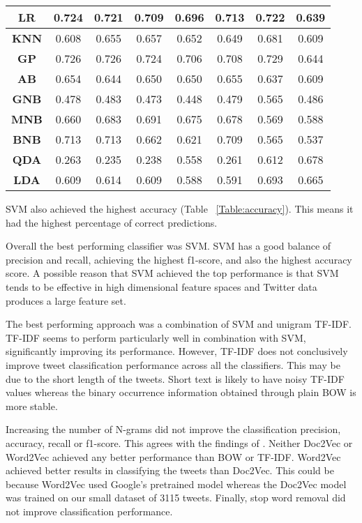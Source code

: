 \begin{table}[h!]
{\begin{tabular}{cccccccc}
\textbf{LR} & 0.724 & 0.721 & 0.709 & 0.696 & 0.713 & 0.722 & 0.639  \\ \hline
\rowcolor[HTML]{EFEFEF} 
\textbf{KNN} & 0.608 & 0.655 & 0.657 & 0.652 & 0.649 & 0.681 & 0.609  \\ \hline
\textbf{GP} & 0.726 & 0.726 & 0.724 & 0.706 & 0.708 & 0.729 & 0.644  \\ \hline
\rowcolor[HTML]{EFEFEF} 
\textbf{AB} & 0.654 & 0.644 & 0.650 & 0.650 & 0.655 & 0.637 & 0.609  \\ \hline
\textbf{GNB} & 0.478 & 0.483 & 0.473 & 0.448 & 0.479 & 0.565 & 0.486  \\ \hline
\rowcolor[HTML]{EFEFEF} 
\textbf{MNB} & \multicolumn{1}{c}{\cellcolor[HTML]{EFEFEF}0.660} & 0.683 & 0.691 & 0.675 & 0.678 & 0.569 & 0.588  \\ \hline
\rowcolor[HTML]{FFFFFF} 
\textbf{BNB} & 0.713 & 0.713 & 0.662 & 0.621 & 0.709 & 0.565 & 0.537  \\ \hline
\rowcolor[HTML]{EFEFEF} 
\textbf{QDA} & 0.263 & 0.235 & 0.238 & 0.558 & 0.261 & 0.612 & 0.678  \\ \hline
\rowcolor[HTML]{FFFFFF} 
\textbf{LDA} & 0.609 & 0.614 & 0.609 & 0.588 & 0.591 & 0.693 & 0.665  \\ \hline
\end{tabular}}
\end{table}

SVM also achieved the highest accuracy (Table ~\ref{Table:accuracy}). This means it had the highest percentage of correct predictions.

Overall the best performing classifier was SVM. SVM has a good balance of precision and recall, achieving the highest f1-score, and also the highest accuracy score. A possible reason that SVM achieved the top performance is that SVM tends to be effective in high dimensional feature spaces and Twitter data produces a large feature set.

The best performing approach was a combination of SVM and unigram TF-IDF. TF-IDF seems to perform particularly well in combination with SVM, significantly improving its performance. However, TF-IDF does not conclusively improve tweet classification performance across all the classifiers. This may be due to the short length of the tweets. Short text is likely to have noisy TF-IDF values whereas the binary occurrence information obtained through plain BOW is more stable.

Increasing the number of N-grams did not improve the classification precision, accuracy, recall or f1-score. This agrees with the findings of \cite{Berm2010}. Neither Doc2Vec or Word2Vec achieved any better performance than BOW or TF-IDF. Word2Vec achieved better results in classifying the tweets than Doc2Vec. This could be because Word2Vec used Google's pretrained model whereas the Doc2Vec model was trained on our small dataset of 3115 tweets. Finally, stop word removal did not improve classification performance.

